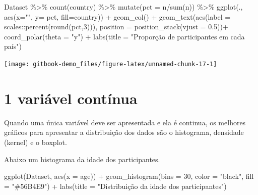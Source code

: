 \documentclass[
]{book}
\newenvironment{Shaded}{\begin{snugshade}}{\end{snugshade}}
\newcommand{\AttributeTok}[1]{\textcolor[rgb]{0.77,0.63,0.00}{#1}}
\newcommand{\DecValTok}[1]{\textcolor[rgb]{0.00,0.00,0.81}{#1}}
\newcommand{\FloatTok}[1]{\textcolor[rgb]{0.00,0.00,0.81}{#1}}
\newcommand{\FunctionTok}[1]{\textcolor[rgb]{0.00,0.00,0.00}{#1}}
\newcommand{\NormalTok}[1]{#1}
\newcommand{\SpecialCharTok}[1]{\textcolor[rgb]{0.00,0.00,0.00}{#1}}
\newcommand{\StringTok}[1]{\textcolor[rgb]{0.31,0.60,0.02}{#1}}
\begin{document}
\begin{Shaded}
\begin{Highlighting}[]
\NormalTok{Dataset }\SpecialCharTok{\%\textgreater{}\%} 
  \FunctionTok{count}\NormalTok{(country) }\SpecialCharTok{\%\textgreater{}\%} 
  \FunctionTok{mutate}\NormalTok{(}\AttributeTok{pct =}\NormalTok{ n}\SpecialCharTok{/}\FunctionTok{sum}\NormalTok{(n)) }\SpecialCharTok{\%\textgreater{}\%} 
  \FunctionTok{ggplot}\NormalTok{(., }\FunctionTok{aes}\NormalTok{(}\AttributeTok{x=}\StringTok{""}\NormalTok{, }\AttributeTok{y=}\NormalTok{ pct, }\AttributeTok{fill=}\NormalTok{country)) }\SpecialCharTok{+}
  \FunctionTok{geom\_col}\NormalTok{() }\SpecialCharTok{+}
  \FunctionTok{geom\_text}\NormalTok{(}\FunctionTok{aes}\NormalTok{(}\AttributeTok{label =}\NormalTok{ scales}\SpecialCharTok{::}\FunctionTok{percent}\NormalTok{(}\FunctionTok{round}\NormalTok{(pct,}\DecValTok{3}\NormalTok{))), }
            \AttributeTok{position =} \FunctionTok{position\_stack}\NormalTok{(}\AttributeTok{vjust =} \FloatTok{0.5}\NormalTok{))}\SpecialCharTok{+}
  \FunctionTok{coord\_polar}\NormalTok{(}\AttributeTok{theta =} \StringTok{"y"}\NormalTok{) }\SpecialCharTok{+}
  \FunctionTok{labs}\NormalTok{(}\AttributeTok{title =} \StringTok{"Proporção de participantes em cada país"}\NormalTok{)}
\end{Highlighting}
\end{Shaded}

\begin{center}\texttt{[image: gitbook-demo\_files/figure-latex/unnamed-chunk-17-1]} \end{center}

\hypertarget{variuxe1vel-contuxednua}{%
\section{1 variável contínua}\label{variuxe1vel-contuxednua}}

Quando uma única variável deve ser apresentada e ela é continua, os melhores gráficos para apresentar a distribuição dos dados são o histograma, densidade (kernel) e o boxplot.

Abaixo um histograma da idade dos participantes.

\begin{Shaded}
\begin{Highlighting}[]
\FunctionTok{ggplot}\NormalTok{(Dataset, }\FunctionTok{aes}\NormalTok{(}\AttributeTok{x =}\NormalTok{ age)) }\SpecialCharTok{+}
  \FunctionTok{geom\_histogram}\NormalTok{(}\AttributeTok{bins =} \DecValTok{30}\NormalTok{, }\AttributeTok{color =} \StringTok{"black"}\NormalTok{, }\AttributeTok{fill =} \StringTok{"\#56B4E9"}\NormalTok{) }\SpecialCharTok{+}
  \FunctionTok{labs}\NormalTok{(}\AttributeTok{title =} \StringTok{"Distribuição da idade dos participantes"}\NormalTok{)}
\end{Highlighting}
\end{Shaded}
\end{document}
